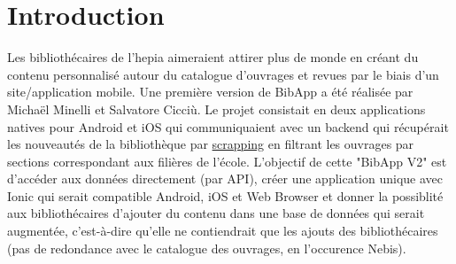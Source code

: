 \documentclass[a4paper, 12pt]{article}
\begin{document}
\newpage

\tableofcontents
\listoffigures
\renewcommand\listoflistingscaption{Table des listings de code source}
\listoflistings
\newpage

\section{Introduction}
Les bibliothécaires de l'hepia aimeraient attirer plus de monde en créant du contenu personnalisé autour du
catalogue d'ouvrages et revues par le biais d'un site/application mobile. Une première version de BibApp a été réalisée
par Michaël Minelli et Salvatore Cicciù. Le projet consistait en deux applications natives pour Android et iOS qui
communiquaient avec un backend qui récupérait les nouveautés de la bibliothèque par
\href{https://fr.wikipedia.org/wiki/Web_scraping}{scrapping} en filtrant les ouvrages par sections correspondant aux
filières de l'école. L'objectif de cette "BibApp V2" est d'accéder aux données directement (par API), créer une
application unique avec Ionic qui serait compatible Android, iOS et Web Browser et donner la possiblité aux
bibliothécaires d'ajouter du contenu dans une base de données qui serait augmentée, c'est-à-dire qu'elle ne contiendrait 
que les ajouts des bibliothécaires (pas de redondance avec le catalogue des ouvrages, en l'occurence Nebis).
\end{document}
